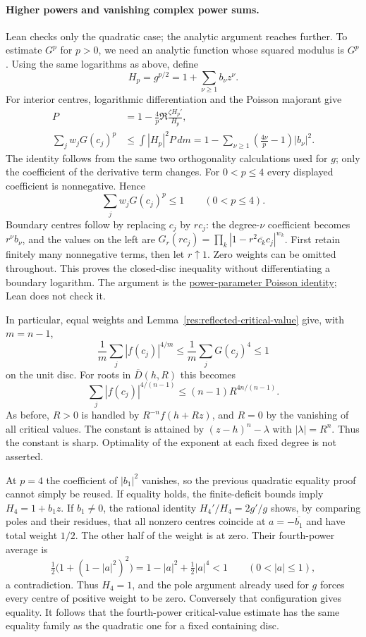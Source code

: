 \documentclass[11pt]{article}
\begin{document}
\paragraph{Higher powers and vanishing complex power sums.}
Lean checks only the quadratic case; the analytic argument reaches
further. To estimate $G^p$ for $p>0$, we need an
analytic function whose squared modulus is $G^p$. Using the same
logarithms as above, define
\[
 H_p=g^{p/2}=1+\sum_{\nu\ge1}b_\nu z^\nu.
\]
For interior centres, logarithmic differentiation and the Poisson
majorant give
\begin{align*}
 P&=1-\frac4p\Re\frac{\zeta H_p'}{H_p},\\
 \sum_jw_jG(c_j)^p
 &\le\int |H_p|^2P\,dm
 =1-\sum_{\nu\ge1}\left(\frac{4\nu}{p}-1\right)|b_\nu|^2.
\end{align*}
The identity follows from the same two orthogonality calculations used
for $g$; only the coefficient of the derivative term changes. For
$0<p\le4$ every displayed coefficient is nonnegative. Hence
\[
 \sum_jw_jG(c_j)^p\le1\qquad(0<p\le4).
\]
Boundary centres follow by replacing $c_j$ by $rc_j$: the degree-$\nu$
coefficient becomes $r^\nu b_\nu$, and the values on the left are
$G_r(rc_j)=\prod_k|1-r^2\overline{c_k}c_j|^{w_k}$.
First retain finitely many nonnegative terms, then let $r\uparrow1$.
Zero weights can be omitted throughout. This proves the closed-disc
inequality without differentiating a boundary logarithm. The argument
is the
\href{https://github.com/wcook04/plectis-erdos/blob/f36a98bf3d3e6f65f1074e3b800e3293d5b8a51a/ErdosProblems/Erdos1041/SharpPowerDiscProducts.md}{power-parameter Poisson identity};
Lean does not check it.

In particular, equal weights and Lemma~\ref{res:reflected-critical-value}
give, with $m=n-1$,
\[
 \frac1m\sum_j|f(c_j)|^{4/m}\le\frac1m\sum_jG(c_j)^4\le1
\]
on the unit disc. For roots in $\overline D(h,R)$ this becomes
\[
 \sum_j|f(c_j)|^{4/(n-1)}\le(n-1)R^{4n/(n-1)}.
\]
As before, $R>0$ is handled by $R^{-n}f(h+Rz)$, and $R=0$ by the
vanishing of all critical values. The constant is attained by
$(z-h)^n-\lambda$ with $|\lambda|=R^n$. Thus the constant is sharp. Optimality of the exponent at each fixed
degree is not asserted.

At $p=4$ the coefficient of $|b_1|^2$ vanishes, so the previous
quadratic equality proof cannot simply be reused. If equality holds,
the finite-deficit bounds imply $H_4=1+b_1z$. If $b_1\ne0$, the
rational identity $H_4'/H_4=2g'/g$ shows, by comparing poles and their
residues, that all nonzero centres coincide at $a=-\overline{b_1}$
and have total weight $1/2$. The other half of the weight is at zero.
Their fourth-power average is
\[
 \tfrac12\bigl(1+(1-|a|^2)^2\bigr)
 =1-|a|^2+\tfrac12|a|^4<1\qquad(0<|a|\le1),
\]
a contradiction. Thus $H_4=1$, and the pole argument already used for
$g$ forces every centre of positive weight to be zero. Conversely that
configuration gives equality. It follows that the fourth-power
critical-value estimate has the same equality family as the quadratic
one for a fixed containing disc.
\end{document}
